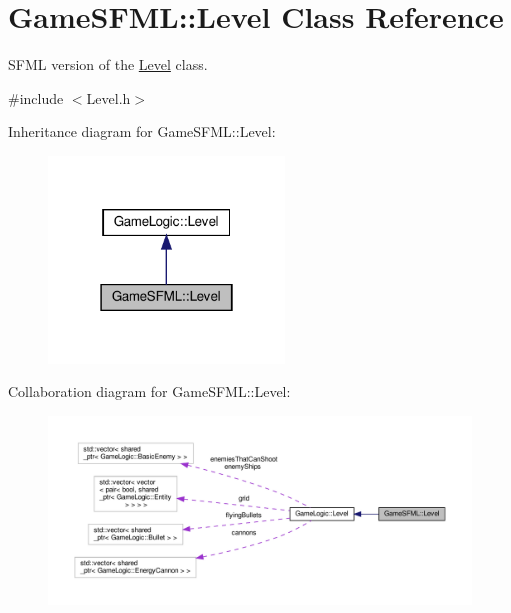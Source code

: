 \hypertarget{classGameSFML_1_1Level}{}\section{Game\+S\+F\+ML\+:\+:Level Class Reference}
\label{classGameSFML_1_1Level}


S\+F\+ML version of the \hyperlink{classGameSFML_1_1Level}{Level} class.  




{\ttfamily \#include $<$Level.\+h$>$}



Inheritance diagram for Game\+S\+F\+ML\+:\+:Level\+:\nopagebreak
\begin{figure}[H]
\begin{center}
\leavevmode
\includegraphics[width=178pt]{classGameSFML_1_1Level__inherit__graph}
\end{center}
\end{figure}


Collaboration diagram for Game\+S\+F\+ML\+:\+:Level\+:\nopagebreak
\begin{figure}[H]
\begin{center}
\leavevmode
\includegraphics[width=350pt]{classGameSFML_1_1Level__coll__graph}
\end{center}
\end{figure}
